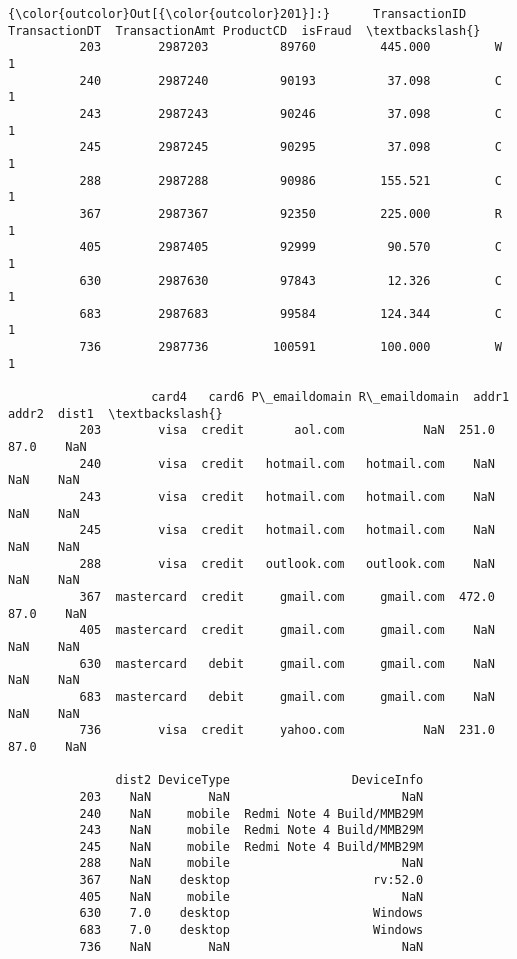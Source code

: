 \documentclass[11pt]{article}
\begin{document}
\begin{Verbatim}[commandchars=\\\{\}]
{\color{outcolor}Out[{\color{outcolor}201}]:}      TransactionID  TransactionDT  TransactionAmt ProductCD  isFraud  \textbackslash{}
          203        2987203          89760         445.000         W        1   
          240        2987240          90193          37.098         C        1   
          243        2987243          90246          37.098         C        1   
          245        2987245          90295          37.098         C        1   
          288        2987288          90986         155.521         C        1   
          367        2987367          92350         225.000         R        1   
          405        2987405          92999          90.570         C        1   
          630        2987630          97843          12.326         C        1   
          683        2987683          99584         124.344         C        1   
          736        2987736         100591         100.000         W        1   
          
                    card4   card6 P\_emaildomain R\_emaildomain  addr1  addr2  dist1  \textbackslash{}
          203        visa  credit       aol.com           NaN  251.0   87.0    NaN   
          240        visa  credit   hotmail.com   hotmail.com    NaN    NaN    NaN   
          243        visa  credit   hotmail.com   hotmail.com    NaN    NaN    NaN   
          245        visa  credit   hotmail.com   hotmail.com    NaN    NaN    NaN   
          288        visa  credit   outlook.com   outlook.com    NaN    NaN    NaN   
          367  mastercard  credit     gmail.com     gmail.com  472.0   87.0    NaN   
          405  mastercard  credit     gmail.com     gmail.com    NaN    NaN    NaN   
          630  mastercard   debit     gmail.com     gmail.com    NaN    NaN    NaN   
          683  mastercard   debit     gmail.com     gmail.com    NaN    NaN    NaN   
          736        visa  credit     yahoo.com           NaN  231.0   87.0    NaN   
          
               dist2 DeviceType                 DeviceInfo  
          203    NaN        NaN                        NaN  
          240    NaN     mobile  Redmi Note 4 Build/MMB29M  
          243    NaN     mobile  Redmi Note 4 Build/MMB29M  
          245    NaN     mobile  Redmi Note 4 Build/MMB29M  
          288    NaN     mobile                        NaN  
          367    NaN    desktop                    rv:52.0  
          405    NaN     mobile                        NaN  
          630    7.0    desktop                    Windows  
          683    7.0    desktop                    Windows  
          736    NaN        NaN                        NaN  
\end{Verbatim}
            
\end{document}
